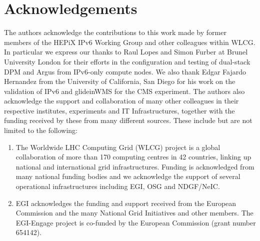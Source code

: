\documentclass[a4paper]{jpconf}
\begin{document}
\section*{Acknowledgements}
The authors acknowledge the contributions to this work made by former members of the HEPiX IPv6 Working Group and other colleagues within WLCG. In particular we express our thanks to Raul Lopes and Simon Furber at Brunel University London for their efforts in the configuration and testing of dual-stack DPM and Argus from IPv6-only compute nodes.
We also thank Edgar Fajardo Hernandez from the University of California, San Diego for his work on the validation of IPv6 and glideinWMS for the CMS experiment. The authors also acknowledge the support and collaboration of many other colleagues in their respective institutes, experiments and IT Infrastructures, together with the funding received by these from many different sources. These include but are not limited to the following:

\begin{enumerate}

\item The Worldwide LHC Computing Grid (WLCG) project is a global collaboration of more than 170 computing centres in 42 countries, linking up national and international grid infrastructures. Funding is acknowledged from many national funding bodies and we acknowledge the support of several operational infrastructures including EGI, OSG and NDGF/NeIC.

\item EGI acknowledges the funding and support received from the European Commission and the many National Grid Initiatives and other members. The EGI-Engage project is co-funded by the European Commission (grant number 654142).

\end{enumerate}
\end{document}
